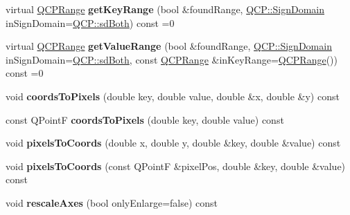 \begin{DoxyCompactItemize}
virtual \hyperlink{class_q_c_p_range}{Q\+C\+P\+Range} {\bfseries get\+Key\+Range} (bool \&found\+Range, \hyperlink{namespace_q_c_p_afd50e7cf431af385614987d8553ff8a9}{Q\+C\+P\+::\+Sign\+Domain} in\+Sign\+Domain=\hyperlink{namespace_q_c_p_afd50e7cf431af385614987d8553ff8a9a3dee7e9cd2fedce9253b83e172626a6c}{Q\+C\+P\+::sd\+Both}) const =0
\item 
\mbox{\label{class_q_c_p_abstract_plottable_aa81c95aec08d86cdd5407e48b83ab186}} 
virtual \hyperlink{class_q_c_p_range}{Q\+C\+P\+Range} {\bfseries get\+Value\+Range} (bool \&found\+Range, \hyperlink{namespace_q_c_p_afd50e7cf431af385614987d8553ff8a9}{Q\+C\+P\+::\+Sign\+Domain} in\+Sign\+Domain=\hyperlink{namespace_q_c_p_afd50e7cf431af385614987d8553ff8a9a3dee7e9cd2fedce9253b83e172626a6c}{Q\+C\+P\+::sd\+Both}, const \hyperlink{class_q_c_p_range}{Q\+C\+P\+Range} \&in\+Key\+Range=\hyperlink{class_q_c_p_range}{Q\+C\+P\+Range}()) const =0
\item 
\mbox{\label{class_q_c_p_abstract_plottable_a7ad84a36472441cf1f555c5683d0da93}} 
void {\bfseries coords\+To\+Pixels} (double key, double value, double \&x, double \&y) const
\item 
\mbox{\label{class_q_c_p_abstract_plottable_a5acb50ae984eef09a7ab92315d2ad708}} 
const Q\+PointF {\bfseries coords\+To\+Pixels} (double key, double value) const
\item 
\mbox{\label{class_q_c_p_abstract_plottable_a3903c1120ab5c27e7fa46b597ef267bd}} 
void {\bfseries pixels\+To\+Coords} (double x, double y, double \&key, double \&value) const
\item 
\mbox{\label{class_q_c_p_abstract_plottable_a28d32c0062b9450847851ffdee1c5f69}} 
void {\bfseries pixels\+To\+Coords} (const Q\+PointF \&pixel\+Pos, double \&key, double \&value) const
\item 
\mbox{\label{class_q_c_p_abstract_plottable_a1491c4a606bccd2d09e65e11b79eb882}} 
void {\bfseries rescale\+Axes} (bool only\+Enlarge=false) const
\item 
\mbox{\label{class_q_c_p_abstract_plottable_ae96b83c961e257da116c6acf9c7da308}} 

\end{DoxyCompactItemize}
